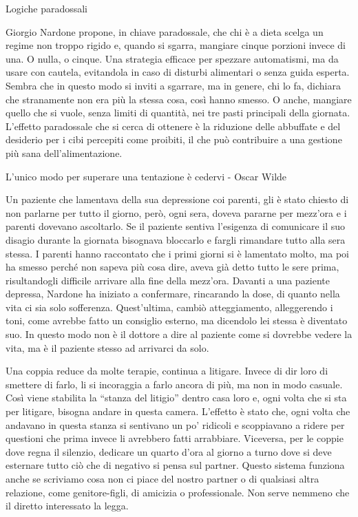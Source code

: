 \documentclass[12pt]{book} %
\begin{document}
\begin{mdframed}[linewidth=1pt]
Logiche paradossali

Giorgio Nardone propone, in chiave paradossale, che chi è a dieta scelga un regime non troppo rigido e, quando si sgarra, mangiare cinque porzioni invece di una. O nulla, o cinque. Una strategia efficace per spezzare automatismi, ma da usare con cautela, evitandola in caso di disturbi alimentari o senza guida esperta. Sembra che in questo modo si inviti a sgarrare, ma in genere, chi lo fa, dichiara che stranamente non era più la stessa cosa, così hanno smesso. O anche, mangiare quello che si vuole, senza limiti di quantità, nei tre pasti principali della giornata. L'effetto paradossale che si cerca di ottenere è la riduzione delle abbuffate e del desiderio per i cibi percepiti come proibiti, il che può contribuire a una gestione più sana dell'alimentazione.

L'unico modo per superare una tentazione è cedervi - Oscar Wilde

Un paziente che lamentava della sua depressione coi parenti, gli è stato chiesto di non parlarne per tutto il giorno, però, ogni sera, doveva pararne per mezz'ora e i parenti dovevano ascoltarlo. Se il paziente sentiva l'esigenza di comunicare il suo disagio durante la giornata bisognava bloccarlo e fargli rimandare tutto alla sera stessa. 
I parenti hanno raccontato che i primi giorni si è lamentato molto, ma poi ha smesso perché non sapeva più cosa dire, aveva già detto tutto le sere prima, risultandogli difficile arrivare alla fine della mezz'ora. 
Davanti a una paziente depressa, Nardone ha iniziato a confermare, rincarando la dose, di quanto nella vita ci sia solo sofferenza. Quest'ultima, cambiò atteggiamento, alleggerendo i toni, come avrebbe fatto un consiglio esterno, ma dicendolo lei stessa è diventato suo. In questo modo non è il dottore a dire al paziente come si dovrebbe vedere la vita, ma è il paziente stesso ad arrivarci da solo.

Una coppia reduce da molte terapie, continua a litigare. Invece di dir loro di smettere di farlo, li si incoraggia a farlo ancora di più, ma non in modo casuale. Così viene stabilita la “stanza del litigio” dentro casa loro e, ogni volta che si sta per litigare, bisogna andare in questa camera. L'effetto è stato che, ogni volta che andavano in questa stanza si sentivano un po' ridicoli e scoppiavano a ridere per questioni che prima invece li avrebbero fatti arrabbiare. Viceversa, per le coppie dove regna il silenzio, dedicare un quarto d'ora al giorno a turno dove si deve esternare tutto ciò che di negativo si pensa sul partner. Questo sistema funziona anche se scriviamo cosa non ci piace del nostro partner o di qualsiasi altra relazione, come genitore-figli, di amicizia o professionale. Non serve nemmeno che il diretto interessato la legga.


\end{mdframed}
\end{document}
